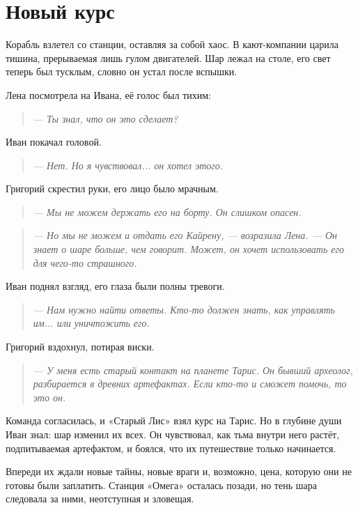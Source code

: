 \documentclass[12pt,a4paper]{book} %
\newenvironment{dialogue}{\begin{quote}\itshape}{\end{quote}}
\begin{document}
\section*{Новый курс}

Корабль взлетел со станции, оставляя за собой хаос. В кают-компании царила тишина, прерываемая лишь гулом двигателей. Шар лежал на столе, его свет теперь был тусклым, словно он устал после вспышки.

Лена посмотрела на Ивана, её голос был тихим:

\begin{dialogue}
--- Ты знал, что он это сделает?
\end{dialogue}

Иван покачал головой.

\begin{dialogue}
--- Нет. Но я чувствовал... он хотел этого.
\end{dialogue}

Григорий скрестил руки, его лицо было мрачным.

\begin{dialogue}
--- Мы не можем держать его на борту. Он слишком опасен.
\end{dialogue}

\begin{dialogue}
--- Но мы не можем и отдать его Кайрену, --- возразила Лена. --- Он знает о шаре больше, чем говорит. Может, он хочет использовать его для чего-то страшного.
\end{dialogue}

Иван поднял взгляд, его глаза были полны тревоги.

\begin{dialogue}
--- Нам нужно найти ответы. Кто-то должен знать, как управлять им... или уничтожить его.
\end{dialogue}

Григорий вздохнул, потирая виски.

\begin{dialogue}
--- У меня есть старый контакт на планете Тарис. Он бывший археолог, разбирается в древних артефактах. Если кто-то и сможет помочь, то это он.
\end{dialogue}

Команда согласилась, и «Старый Лис» взял курс на Тарис. Но в глубине души Иван знал: шар изменил их всех. Он чувствовал, как тьма внутри него растёт, подпитываемая артефактом, и боялся, что их путешествие только начинается.

Впереди их ждали новые тайны, новые враги и, возможно, цена, которую они не готовы были заплатить. Станция «Омега» осталась позади, но тень шара следовала за ними, неотступная и зловещая.
\end{document}

